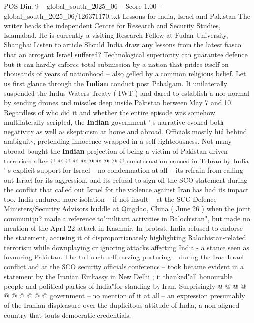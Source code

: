 \begin{textsample}{POS Dim 9 – global\_south\_2025\_06 – Score 1.00 – global\_south\_2025\_06/126371170.txt}  \label{ex:f9_pos_191}
Lessons for India, Israel and Pakistan The writer heads the independent Centre for Research and Security Studies, Islamabad.
He is currently a visiting Research Fellow at Fudan University, Shanghai Listen to article Should India draw any lessons from the latest fiasco that an arrogant Israel suffered?
Technological superiority can guarantee defence but it can hardly enforce total submission by a nation that prides itself on thousands of years of nationhood -- also gelled by a common religious belief.
Let us first glance through the \textbf{Indian} conduct post Pahalgam.
It unilaterally suspended the Indus Waters Treaty ( IWT ) and dared to establish a neo-normal by sending drones and missiles deep inside Pakistan between May 7 and 10.
Regardless of who did it and whether the entire episode was somehow multilaterally scripted, the \textbf{Indian} government ' s narrative evoked both negativity as well as skepticism at home and abroad.
Officials mostly hid behind ambiguity, pretending innocence wrapped in a self-righteousness.
Not many abroad bought the \textbf{Indian} projection of being a victim of Pakistan-driven terrorism after @ @ @ @ @ @ @ @ @ @ consternation caused in Tehran by India ' s explicit support for Israel -- no condemnation at all -- its refrain from calling out Israel for its aggression, and its refusal to sign off the SCO statement during the conflict that called out Israel for the violence against Iran has had its impact too.
India endured more isolation -- if not insult -- at the SCO Defence Ministers/Security Advisors huddle at Qingdao, China ( June 26 ) when the joint communiqu? made a reference to"militant activities in Balochistan", but made no mention of the April 22 attack in Kashmir.
In protest, India refused to endorse the statement, accusing it of disproportionately highlighting Balochistan-related terrorism while downplaying or ignoring attacks affecting India - a stance seen as favouring Pakistan.
The toll such self-serving posturing -- during the Iran-Israel conflict and at the SCO security officials conference -- took became evident in a statement by the Iranian Embassy in New Delhi ; it thanked"all honourable people and political parties of India"for standing by Iran.
Surprisingly @ @ @ @ @ @ @ @ @ @ government -- no mention of it at all -- an expression presumably of the Iranian displeasure over the duplicitous attitude of India, a non-aligned country that touts democratic credentials.

\end{textsample}
